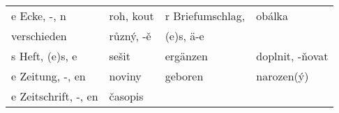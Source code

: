 \begin{table}[ht!]
\begin{tabular}{llll}
          e Ecke, -, n            & roh, kout     & r Briefumschlag,  & obálka                    \\
          verschieden             & různý, -ě     & (e)s, ä-e         &                           \\
          s Heft, (e)s, e         & sešit         &  ergänzen         & doplnit, -ňovat           \\
          e Zeitung, -, en        & noviny        & geboren           & narozen(ý)                \\
          e Zeitschrift, -, en    & časopis       &                   &              \\
         \hline
      \end{tabular}
      \caption*{}
    \end{table}
      



















































